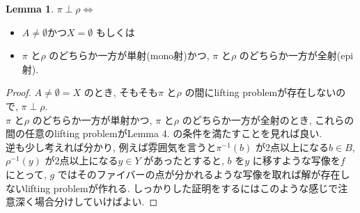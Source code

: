 \documentclass[. /main]{subfiles}
\theoremstyle{definition}
\newtheorem{lemm}[theo]{Lemma}
\begin{document}
\begin{lemm}
$\pi \perp \rho \Leftrightarrow$
\begin{itemize}
\item $A \neq \emptyset$かつ$X=\emptyset$ もしくは
\item $\pi$ と$\rho$ のどちらか一方が単射(mono射)かつ, $\pi$ と$\rho$ のどちらか一方が全射(epi射). 
\end{itemize}
\end{lemm}
\begin{proof}
$A \neq \emptyset = X$ のとき, そもそも$\pi$ と$\rho$ の間にlifting problemが存在しないので, $\pi \perp \rho$. \\
$\pi$ と$\rho$ のどちらか一方が単射かつ, $\pi$ と$\rho$ のどちらか一方が全射のとき, これらの間の任意のlifting problemがLemma 4. の条件を満たすことを見れば良い. \\
逆も少し考えれば分かり, 例えば雰囲気を言うと${\pi}^{-1}(b)$ が2点以上になる$b \in B$, ${\rho}^{-1}(y)$ が2点以上になる$y \in Y$ があったとすると, $b$ を$y$ に移すような写像を$f$ にとって, $g$ ではそのファイバーの点が分かれるような写像を取れば解が存在しないlifting problemが作れる. しっかりした証明をするにはこのような感じで注意深く場合分けしていけばよい. 
\end{proof}
\end{document}

